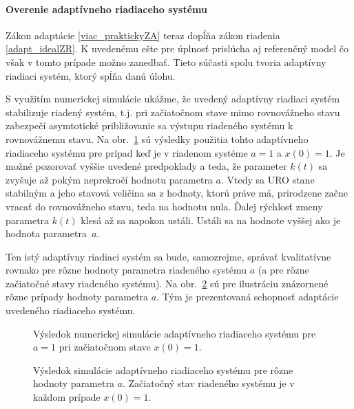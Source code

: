 \documentclass[a4paper, 10pt, ]{article}
\begin{document}
\paragraph{Overenie adaptívneho riadiaceho systému}

Zákon adaptácie \eqref{viac_praktickyZA} teraz dopĺňa zákon riadenia \eqref{adapt_idealZR}. K uvedenému ešte pre úplnosť prislúcha aj referenčný model čo však v tomto prípade možno zanedbať. Tieto súčasti spolu tvoria adaptívny riadiaci systém, ktorý spĺňa danú úlohu.

S využitím numerickej simulácie ukážme, že uvedený adaptívny riadiaci systém stabilizuje riadený systém, t.j. pri začiatočnom stave mimo rovnovážneho stavu zabezpečí asymtotické približovanie sa výstupu riadeného systému k rovnovážnemu stavu. Na obr.~\ref{Výsledok numerickej simulácie adapt systému} sú výsledky použitia tohto adaptívneho riadiaceho systému pre prípad keď je v riadenom systéme $a = 1$ a $x(0) = 1$. Je možné pozorovať vyššie uvedené predpoklady a teda, že parameter $k(t)$ sa zvyšuje až pokým neprekročí hodnotu parametra $a$. Vtedy sa URO stane stabilným a jeho stavová veličina sa z hodnoty, ktorú práve má, prirodzene začne vracať do rovnovážneho stavu, teda na hodnotu nula. Ďalej rýchlosť zmeny parametra $k(t)$ klesá až sa napokon ustáli. Ustáli sa na hodnote vyššej ako je hodnota parametra~$a$.

Ten istý adaptívny riadiaci systém sa bude, samozrejme, správať kvalitatívne rovnako pre rôzne hodnoty parametra riadeného systému $a$ (a pre rôzne začiatočné stavy riadeného systému). Na obr.~\ref{Výsledok numerickej simulácie adapt systému pripady} sú pre ilustráciu znázornené rôzne prípady hodnoty parametra $a$. Tým je prezentovaná schopnosť adaptácie uvedeného riadiaceho systému.


\begin{figure}[!t]
	\centering
	\caption{Výsledok numerickej simulácie adaptívneho riadiaceho systému pre $a = 1$ pri začiatočnom stave $x(0) = 1$.}
	\label{Výsledok numerickej simulácie adapt systému}
\end{figure}


\begin{figure}[!t]
	\centering
	\caption{Výsledok simulácie adaptívneho riadiaceho systému pre rôzne hodnoty parametra $a$. Začiatočný stav riadeného systému je v každom prípade $x(0) = 1$.}
	\label{Výsledok numerickej simulácie adapt systému pripady}
\end{figure}
\end{document}
